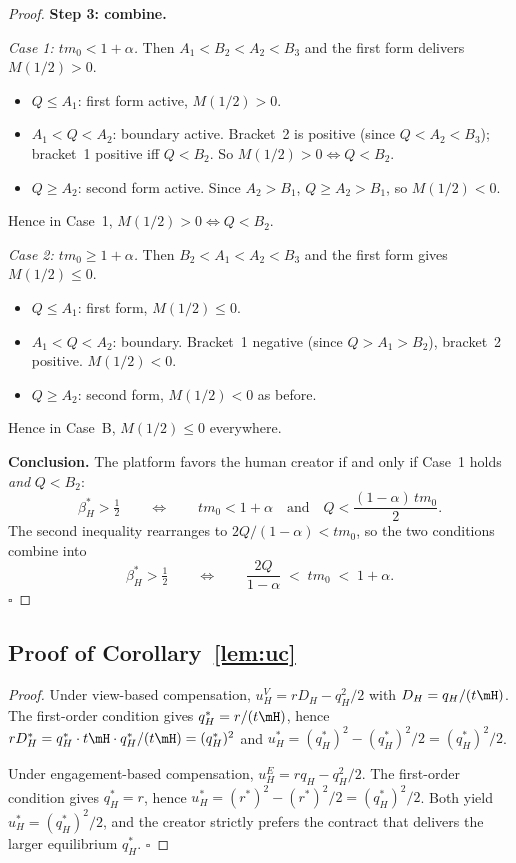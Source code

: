 \begin{proof}
\medskip
\textbf{Step 3: combine.}
 
\emph{Case 1: $tm_0 < 1+\alpha$.} Then $A_1 < B_2 < A_2 < B_3$ and the first form delivers $M(1/2) > 0$.
\begin{itemize}
    \item $Q \le A_1$: first form active, $M(1/2) > 0$.
    \item $A_1 < Q < A_2$: boundary active. Bracket~2 is positive (since $Q < A_2 < B_3$); bracket~1 positive iff $Q < B_2$. So $M(1/2) > 0 \iff Q < B_2$.
    \item $Q \ge A_2$: second form active. Since $A_2 > B_1$, $Q \ge A_2 > B_1$, so $M(1/2) < 0$.
\end{itemize}
Hence in Case~1, $M(1/2) > 0 \iff Q < B_2$.
 
\emph{Case 2: $tm_0 \ge 1+\alpha$.} Then $B_2 < A_1 < A_2 < B_3$ and the first form gives $M(1/2) \le 0$.
\begin{itemize}
    \item $Q \le A_1$: first form, $M(1/2) \le 0$.
    \item $A_1 < Q < A_2$: boundary. Bracket~1 negative (since $Q > A_1 > B_2$), bracket~2 positive. $M(1/2) < 0$.
    \item $Q \ge A_2$: second form, $M(1/2) < 0$ as before.
\end{itemize}
Hence in Case~B, $M(1/2) \le 0$ everywhere.
 
\medskip
\textbf{Conclusion.}
The platform favors the human creator if and only if Case~1 holds \emph{and} $Q < B_2$:
\[
    \beta_H^* > \tfrac{1}{2}
    \qquad\Longleftrightarrow\qquad
    tm_0 < 1+\alpha \quad\text{and}\quad Q < \frac{(1-\alpha)\,tm_0}{2}.
\]
The second inequality rearranges to $2Q/(1-\alpha) < tm_0$, so the two conditions combine into
\[
    \beta_H^* > \tfrac{1}{2}
    \qquad\Longleftrightarrow\qquad
    \frac{2Q}{1-\alpha} \;<\; tm_0 \;<\; 1+\alpha.
\]
\hfill $\square$
\end{proof}


\subsection*{Proof of Corollary~\ref{lem:uc}}
\begin{proof}
Under view-based compensation, $u_H^{V} = rD_H - q_H^{2}/2$ with
$D_H = q_H/(t\mH)$. The first-order condition gives
$q_H^* = r/(t\mH)$, hence $rD_H^* = q_H^*\cdot t\mH \cdot q_H^*/(t\mH) = (q_H^*)^2$
and $u_H^* = (q_H^*)^2 - (q_H^*)^2/2 = (q_H^*)^2/2$.

Under engagement-based compensation, $u_H^{E} = rq_H - q_H^{2}/2$.
The first-order condition gives $q_H^* = r$, hence
$u_H^* = (r^*)^{2} - (r^*)^{2}/2 = (q_H^*)^2/2$. Both yield
$u_H^* = (q_H^*)^2/2$, and the creator strictly prefers the contract
that delivers the larger equilibrium $q_H^*$. \hfill $\square$
\end{proof}
 
